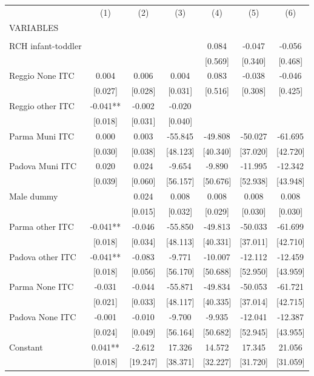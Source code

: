 \begin{tabular}{lcccccc} \hline
 & (1) & (2) & (3) & (4) & (5) & (6) \\
VARIABLES &  &  &  &  &  &  \\ \hline
 &  &  &  &  &  &  \\
RCH infant-toddler &  &  &  & 0.084 & -0.047 & -0.056 \\
 &  &  &  & [0.569] & [0.340] & [0.468] \\
Reggio None ITC & 0.004 & 0.006 & 0.004 & 0.083 & -0.038 & -0.046 \\
 & [0.027] & [0.028] & [0.031] & [0.516] & [0.308] & [0.425] \\
Reggio other ITC & -0.041** & -0.002 & -0.020 &  &  &  \\
 & [0.018] & [0.031] & [0.040] &  &  &  \\
Parma Muni ITC & 0.000 & 0.003 & -55.845 & -49.808 & -50.027 & -61.695 \\
 & [0.030] & [0.038] & [48.123] & [40.340] & [37.020] & [42.720] \\
Padova Muni ITC & 0.020 & 0.024 & -9.654 & -9.890 & -11.995 & -12.342 \\
 & [0.039] & [0.060] & [56.157] & [50.676] & [52.938] & [43.948] \\
Male dummy &  & 0.024 & 0.008 & 0.008 & 0.008 & 0.008 \\
 &  & [0.015] & [0.032] & [0.029] & [0.030] & [0.030] \\
Parma other ITC & -0.041** & -0.046 & -55.850 & -49.813 & -50.033 & -61.699 \\
 & [0.018] & [0.034] & [48.113] & [40.331] & [37.011] & [42.710] \\
Padova other ITC & -0.041** & -0.083 & -9.771 & -10.007 & -12.112 & -12.459 \\
 & [0.018] & [0.056] & [56.170] & [50.688] & [52.950] & [43.959] \\
Parma None ITC & -0.031 & -0.044 & -55.871 & -49.834 & -50.053 & -61.721 \\
 & [0.021] & [0.033] & [48.117] & [40.335] & [37.014] & [42.715] \\
Padova None ITC & -0.001 & -0.010 & -9.700 & -9.935 & -12.041 & -12.387 \\
 & [0.024] & [0.049] & [56.164] & [50.682] & [52.945] & [43.955] \\
Constant & 0.041** & -2.612 & 17.326 & 14.572 & 17.345 & 21.056 \\
 & [0.018] & [19.247] & [38.371] & [32.227] & [31.720] & [31.059] \\

\end{tabular}
